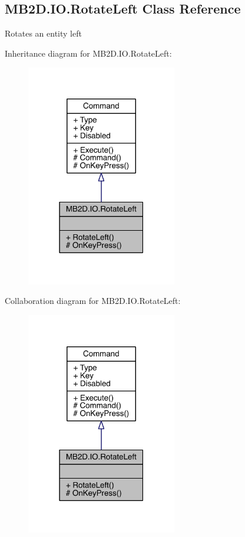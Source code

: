 \hypertarget{class_m_b2_d_1_1_i_o_1_1_rotate_left}{}\subsection{M\+B2\+D.\+I\+O.\+Rotate\+Left Class Reference}
\label{class_m_b2_d_1_1_i_o_1_1_rotate_left}


Rotates an entity left  




Inheritance diagram for M\+B2\+D.\+I\+O.\+Rotate\+Left\+:
\nopagebreak
\begin{figure}[H]
\begin{center}
\leavevmode
\includegraphics[width=186pt]{class_m_b2_d_1_1_i_o_1_1_rotate_left__inherit__graph}
\end{center}
\end{figure}


Collaboration diagram for M\+B2\+D.\+I\+O.\+Rotate\+Left\+:
\nopagebreak
\begin{figure}[H]
\begin{center}
\leavevmode
\includegraphics[width=186pt]{class_m_b2_d_1_1_i_o_1_1_rotate_left__coll__graph}
\end{center}
\end{figure}
